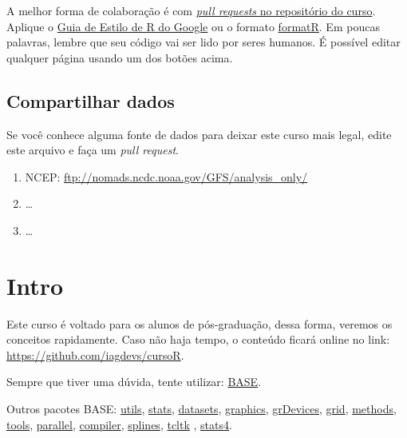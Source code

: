 \documentclass[]{book}
\providecommand{\tightlist}{%
  \setlength{\itemsep}{0pt}\setlength{\parskip}{0pt}}
\theoremstyle{definition}
\theoremstyle{definition}
\theoremstyle{definition}
\theoremstyle{remark}
\begin{document}
A melhor forma de colaboração é com
\href{https://github.com/iagdevs/cursoR/pull/new/master}{\emph{pull
requests} no repositório do curso}. Aplique o
\href{https://google.github.io/styleguide/Rguide.xml}{Guia de Estilo de
R do Google} ou o formato \href{https://yihui.name/formatr/}{formatR}.
Em poucas palavras, lembre que seu código vai ser lido por seres
humanos. É possível editar qualquer página usando um dos botões acima.

\section{Compartilhar dados}\label{compartilhar-dados}

Se você conhece alguma fonte de dados para deixar este curso mais legal,
edite este arquivo e faça um \emph{pull request}.

\begin{enumerate}
\def\labelenumi{\arabic{enumi}.}
\tightlist
\item
  NCEP: \url{ftp://nomads.ncdc.noaa.gov/GFS/analysis_only/}
\item
  \ldots{}
\item
  \ldots{}
\end{enumerate}

\chapter{Intro}\label{intro}

Este curso é voltado para os alunos de pós-graduação, dessa forma,
veremos os conceitos rapidamente. Caso não haja tempo, o conteúdo ficará
online no link: \url{https://github.com/iagdevs/cursoR}.

Sempre que tiver uma dúvida, tente utilizar:
\href{http://stat.ethz.ch/R-manual/R-devel/library/base/html/00Index.html}{BASE}.

Outros pacotes BASE:
\href{http://stat.ethz.ch/R-manual/R-devel/library/utils/html/00Index.html}{utils},
\href{http://stat.ethz.ch/R-manual/R-devel/library/stats/html/00Index.html}{stats},
\href{http://stat.ethz.ch/R-manual/R-devel/library/datasets/html/00Index.html}{datasets},
\href{http://stat.ethz.ch/R-manual/R-devel/library/graphics/html/00Index.html}{graphics},
\href{https://stat.ethz.ch/R-manual/R-devel/library/grDevices/html/00Index.html}{grDevices},
\href{https://stat.ethz.ch/R-manual/R-devel/library/grid/html/00Index.html}{grid},
\href{https://stat.ethz.ch/R-manual/R-devel/library/methods/html/00Index.html}{methods},
\href{https://stat.ethz.ch/R-manual/R-devel/library/tools/html/00Index.html}{tools},
\href{https://stat.ethz.ch/R-manual/R-devel/library/parallel/html/00Index.html}{parallel},
\href{https://stat.ethz.ch/R-manual/R-devel/library/compiler/html/00Index.html}{compiler},
\href{https://stat.ethz.ch/R-manual/R-devel/library/splines/html/00Index.html}{splines},
\href{https://stat.ethz.ch/R-manual/R-devel/library/tcltk/html/00Index.html}{tcltk}
,
\href{https://stat.ethz.ch/R-manual/R-devel/library/stats4/html/00Index.html}{stats4}.
\end{document}
